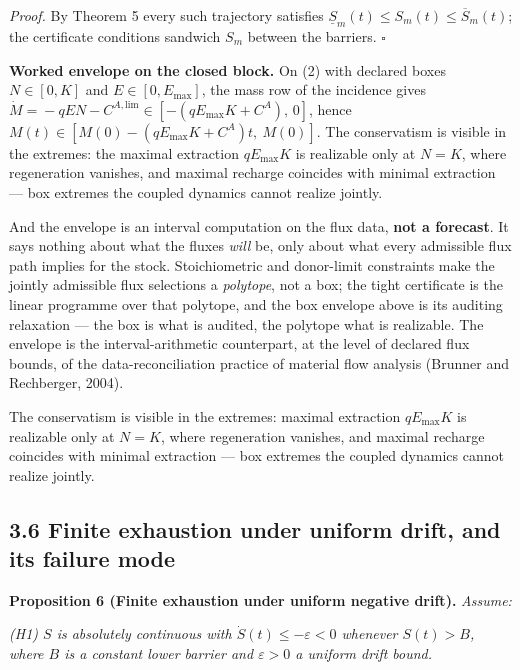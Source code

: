 \documentclass[11pt]{article}
\begin{document}
\emph{Proof.} By Theorem 5 every such trajectory satisfies \(\underline{S}_m(t) \le S_m(t) \le \overline{S}_m(t)\); the certificate conditions sandwich \(S_m\) between the barriers. \(\square\)

\textbf{Worked envelope on the closed block.} On (2) with declared boxes \(N \in [0, K]\) and \(E \in [0, E_{\max}]\), the mass row of the incidence gives \(\dot M =\allowbreak{} -qEN - C^{A,\allowbreak{}\mathrm{lim}} \in [-(qE_{\max}K +\allowbreak{} C^A),\allowbreak{}\,\allowbreak{} 0]\), hence \(M(t) \in [M(0) - (qE_{\max}K +\allowbreak{} C^A)t,\allowbreak{}\ M(0)]\). The conservatism is visible in the extremes: the maximal extraction \(qE_{\max}K\) is realizable only at \(N = K\), where regeneration vanishes, and maximal recharge coincides with minimal extraction --- box extremes the coupled dynamics cannot realize jointly.

And the envelope is an interval computation on the flux data, \textbf{not a forecast}. It says nothing about what the fluxes \emph{will} be, only about what every admissible flux path implies for the stock. Stoichiometric and donor-limit constraints make the jointly admissible flux selections a \emph{polytope}, not a box; the tight certificate is the linear programme over that polytope, and the box envelope above is its auditing relaxation --- the box is what is audited, the polytope what is realizable. The envelope is the interval-arithmetic counterpart, at the level of declared flux bounds, of the data-reconciliation practice of material flow analysis (Brunner and Rechberger, 2004).

The conservatism is visible in the extremes: maximal extraction \(qE_{\max}K\) is realizable only at \(N=K\), where regeneration vanishes, and maximal recharge coincides with minimal extraction --- box extremes the coupled dynamics cannot realize jointly.

\subsection*{3.6 Finite exhaustion under uniform drift, and its failure mode}\label{36-finite-exhaustion-under-uniform-drift-and-its-failure-mode}

\textbf{Proposition 6 (Finite exhaustion under uniform negative drift).} \emph{Assume:}

\emph{(H1) \(S\) is absolutely continuous with \(\dot S(t) \le -\varepsilon < 0\) whenever \(S(t) > B\), where \(B\) is a constant lower barrier and \(\varepsilon > 0\) a uniform drift bound.}
\end{document}
